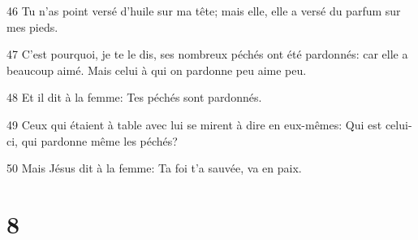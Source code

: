 \par 46 Tu n'as point versé d'huile sur ma tête; mais elle, elle a versé du parfum sur mes pieds.
\par 47 C'est pourquoi, je te le dis, ses nombreux péchés ont été pardonnés: car elle a beaucoup aimé. Mais celui à qui on pardonne peu aime peu.
\par 48 Et il dit à la femme: Tes péchés sont pardonnés.
\par 49 Ceux qui étaient à table avec lui se mirent à dire en eux-mêmes: Qui est celui-ci, qui pardonne même les péchés?
\par 50 Mais Jésus dit à la femme: Ta foi t'a sauvée, va en paix.

\chapter{8}

